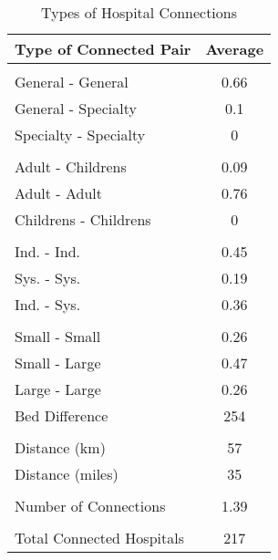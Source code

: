 \begin{table}[ht!]
\centering
\caption{Types of Hospital Connections\label{hospital_pair_types}}
\centering
\begin{tabular}[t]{lc}
\toprule
Type of Connected Pair & Average\\
\midrule
\addlinespace[0.3em]
\multicolumn{2}{l}{\textbf{}}\\
General - General & 0.66\\
General - Specialty & 0.1\\
Specialty - Specialty & 0\\
\addlinespace[0.3em]
\multicolumn{2}{l}{\textbf{}}\\
Adult - Childrens & 0.09\\
Adult - Adult & 0.76\\
Childrens - Childrens & 0\\
\addlinespace[0.3em]
\multicolumn{2}{l}{\textbf{}}\\
Ind. - Ind. & 0.45\\
Sys. - Sys. & 0.19\\
Ind. - Sys. & 0.36\\
\addlinespace[0.3em]
\multicolumn{2}{l}{\textbf{}}\\
Small - Small & 0.26\\
Small - Large & 0.47\\
Large - Large & 0.26\\
Bed Difference & 254\\
\addlinespace[0.3em]
\multicolumn{2}{l}{\textbf{}}\\
Distance (km) & 57\\
Distance (miles) & 35\\
\addlinespace[0.3em]
\multicolumn{2}{l}{\textbf{}}\\
Number of Connections & 1.39\\
\addlinespace[0.3em]
\multicolumn{2}{l}{\textbf{}}\\
Total Connected Hospitals & 217\\
\bottomrule
\end{tabular}
\end{table}
